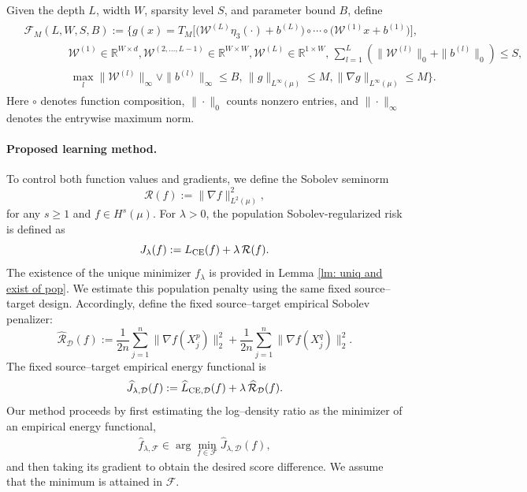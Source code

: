 \documentclass[11pt]{article}
\theoremstyle{plain}
\theoremstyle{definition}
\theoremstyle{remark}
\begin{document}
Given the depth $L$, width $W$, sparsity level $S$, and parameter bound $B$, define
\begin{eqnarray}\label{eq:network_class}
\begin{aligned}
    &\mathcal{F}_M(L,W,S,B):=
    \Bigg\{
    g(x)=T_M\Big[
    \big(\mathcal{W}^{(L)}\eta_3(\cdot)+b^{(L)}\big)
    \circ\cdots\circ
    \big(\mathcal{W}^{(1)}x+b^{(1)}\big)
    \Big],\\
    &\qquad \qquad
    \mathcal{W}^{(1)}\in\mathbb R^{W\times d},
    \mathcal{W}^{(2,\dots,L-1)}\in\mathbb R^{W\times W},
    \mathcal{W}^{(L)}\in\mathbb R^{1\times W},\, \sum_{l=1}^L
    \left(
    \|\mathcal W^{(l)}\|_0+\|b^{(l)}\|_0
    \right)
    \le S,\\
    &\qquad \qquad
    \, \max_l
    \|\mathcal W^{(l)}\|_\infty
    \vee
    \|b^{(l)}\|_\infty
    \le B,
    \,
    \|g\|_{L^\infty(\mu)}\le M,
    \|\nabla g\|_{L^\infty(\mu)}\le M
    \Bigg\}.
\end{aligned}
\end{eqnarray}
Here $\circ$ denotes function composition, $\|\cdot\|_0$ counts nonzero entries, and $\|\cdot\|_\infty$ denotes the entrywise maximum norm.


\paragraph{Proposed learning method.}
To control both function values and gradients, we define the Sobolev seminorm
\[
  \mathcal{R}(f):= \|\nabla f\|_{L^2(\mu)}^2,
\]
for any $ s\geq 1$ and $f\in H^s(\mu)$.  For $\lambda>0$, the population Sobolev-regularized risk is defined as
\[
  J_\lambda(f):= L_{\rm CE}(f) + \lambda\,\mathcal{R}(f).
\]
The existence of the unique minimizer $f_\lambda$ is provided in Lemma \ref{lm: uniq and exist of pop}.
We estimate this population penalty using the same fixed source--target design. Accordingly, define the fixed source--target empirical Sobolev penalizer:
\[
  \widehat{\mathcal{R}}_{\mathcal D}(f):=
  \frac{1}{2n}\sum_{j=1}^{n} \|\nabla f(X_j^p)\|_2^2
  +
  \frac{1}{2n}\sum_{j=1}^{n} \|\nabla f(X_j^q)\|_2^2.
\]
The fixed source--target empirical energy functional is
\[
  \widehat J_{\lambda,\mathcal D}(f):= \widehat L_{{\rm CE}, \mathcal D}(f)
     + \lambda\,\widehat{\mathcal{R}}_{\mathcal D}(f).
\]
Our method proceeds by first estimating the log–density ratio as the minimizer of an empirical energy functional,
\begin{eqnarray}\label{eq:empirical_loss}
    \widehat f_{\lambda, \mathcal  F}
  \in \arg\min_{f\in \mathcal  F} \widehat J_{\lambda,\mathcal D}(f),
\end{eqnarray}
and then taking its gradient to obtain the desired score difference.
We assume that the minimum is attained in $\mathcal  F$.
\end{document}
